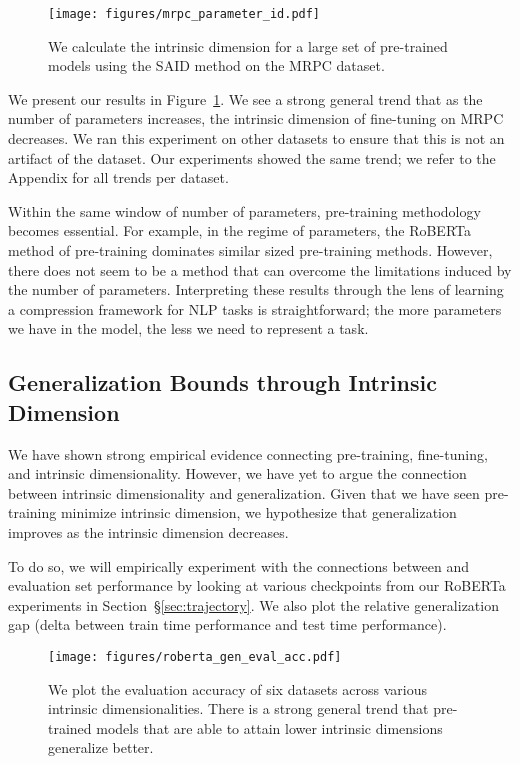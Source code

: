 \documentclass{article} \usepackage{iclr2020_conference,times}
\begin{document}
\begin{figure}[h]
    \centering
    \texttt{[image: figures/mrpc\_parameter\_id.pdf]}
    \caption{We calculate the intrinsic dimension for a large set of pre-trained models using the SAID method on the MRPC dataset.}
    \label{fig:mrpc_parameter_id}
\end{figure}

We present our results in Figure~\ref{fig:mrpc_parameter_id}. We see a strong general trend that as the number of parameters increases, the intrinsic dimension of fine-tuning on MRPC decreases. We ran this experiment on other datasets to ensure that this is not an artifact of the dataset. Our experiments showed the same trend; we refer to the Appendix for all trends per dataset.

Within the same window of number of parameters, pre-training methodology becomes essential. For example, in the regime of  parameters, the RoBERTa method of pre-training dominates similar sized pre-training methods. However, there does not seem to be a method that can overcome the limitations induced by the number of parameters. Interpreting these results through the lens of learning a compression framework for NLP tasks is straightforward; the more parameters we have in the model, the less we need to represent a task.


\subsection{Generalization Bounds through Intrinsic Dimension}
\label{sec:generalization}
We have shown strong empirical evidence connecting pre-training, fine-tuning, and intrinsic dimensionality. However, we have yet to argue the connection between intrinsic dimensionality and generalization. Given that we have seen pre-training minimize intrinsic dimension, we hypothesize that generalization improves as the intrinsic dimension decreases.

To do so, we will empirically experiment with the connections between  and evaluation set performance by looking at various checkpoints from our RoBERTa experiments in Section~\S\ref{sec:trajectory}. We also plot the relative generalization gap (delta between train time performance and test time performance).


\begin{figure}
    \centering
    \texttt{[image: figures/roberta\_gen\_eval\_acc.pdf]}
    \caption{We plot the evaluation accuracy of six datasets across various intrinsic dimensionalities. There is a strong general trend that pre-trained models that are able to attain lower intrinsic dimensions generalize better.}
    \label{fig:roberta_gen_eval_acc}
\end{figure}
\end{document}
